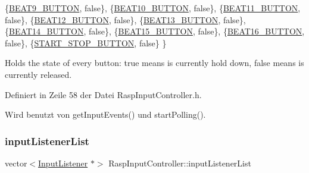 \begin{DoxyCode}
            \{\hyperlink{namespaceinputs_af628ea84bf7114a62249d4bb425ed06a}{BEAT9\_BUTTON},           \textcolor{keyword}{false}\},
            \{\hyperlink{namespaceinputs_a9778bcf3a44a9d16ae156bac6d745a24}{BEAT10\_BUTTON},          \textcolor{keyword}{false}\},
            \{\hyperlink{namespaceinputs_ad09e4010a8b08721988599b198645372}{BEAT11\_BUTTON},          \textcolor{keyword}{false}\},
            \{\hyperlink{namespaceinputs_a7b6bb44b9241cac31ff9909c3fc88271}{BEAT12\_BUTTON},          \textcolor{keyword}{false}\},
            \{\hyperlink{namespaceinputs_a8f9d547eaa8c52cebfa64221341f266a}{BEAT13\_BUTTON},          \textcolor{keyword}{false}\},
            \{\hyperlink{namespaceinputs_a4dfd34a5656f72c71f1b2dd8efc963dc}{BEAT14\_BUTTON},          \textcolor{keyword}{false}\},
            \{\hyperlink{namespaceinputs_a1952aa2d27b65c8d8899a1ae1cfb7bb9}{BEAT15\_BUTTON},          \textcolor{keyword}{false}\},
            \{\hyperlink{namespaceinputs_af0f3099a06352ba4eb0808091b908178}{BEAT16\_BUTTON},          \textcolor{keyword}{false}\},
            \{\hyperlink{namespaceinputs_ab1d04ae8b7a7f4d11849c110f20fae10}{START\_STOP\_BUTTON},      \textcolor{keyword}{false}\}
    \}
\end{DoxyCode}


Holds the state of every button\+: true means is currently hold down, false means is currently released. 



Definiert in Zeile 58 der Datei Rasp\+Input\+Controller.\+h.



Wird benutzt von get\+Input\+Events() und start\+Polling().

\mbox{\label{class_rasp_input_controller_a5a5a8d99d69c35e206ddf7467e36cfae}} 
\subsubsection{\texorpdfstring{input\+Listener\+List}{inputListenerList}}
{\footnotesize\ttfamily vector$<$\hyperlink{class_input_listener}{Input\+Listener} $\ast$$>$ Rasp\+Input\+Controller\+::input\+Listener\+List\hspace{0.3cm}{\ttfamily [private]}}



